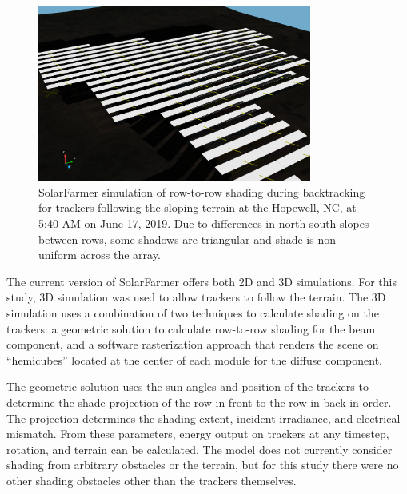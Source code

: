 \documentclass[conference]{IEEEtran}
\begin{document}
\begin{figure}[htbp]
\centerline{\includegraphics[width=9cm]{Hopewell-Friends-SolarFarmer-shade-follows-std.png}}
\caption{SolarFarmer simulation of row-to-row shading during backtracking for trackers following the sloping terrain at the Hopewell, NC, at 5:40 AM on June 17, 2019. Due to differences in north-south slopes between rows, some shadows are triangular and shade is non-uniform across the array.}
\label{terrain-shade}
\end{figure}

The current version of SolarFarmer offers both 2D and 3D simulations. For this study, 3D simulation was used to allow trackers to follow the terrain. The 3D simulation uses a combination of two techniques to calculate shading on the trackers: a geometric solution to calculate row-to-row shading for the beam component, and a software rasterization approach that renders the scene on “hemicubes” located at the center of each module for the diffuse component. 

The geometric solution uses the sun angles and position of the trackers to determine the shade projection of the row in front to the row in back in order. The projection determines the shading extent, incident irradiance, and electrical mismatch. From these parameters,  energy output on trackers at any timestep, rotation, and terrain can be calculated. The model does not currently consider shading from arbitrary obstacles or the terrain, but for this study there were no other shading obstacles other than the trackers themselves.
\end{document}
